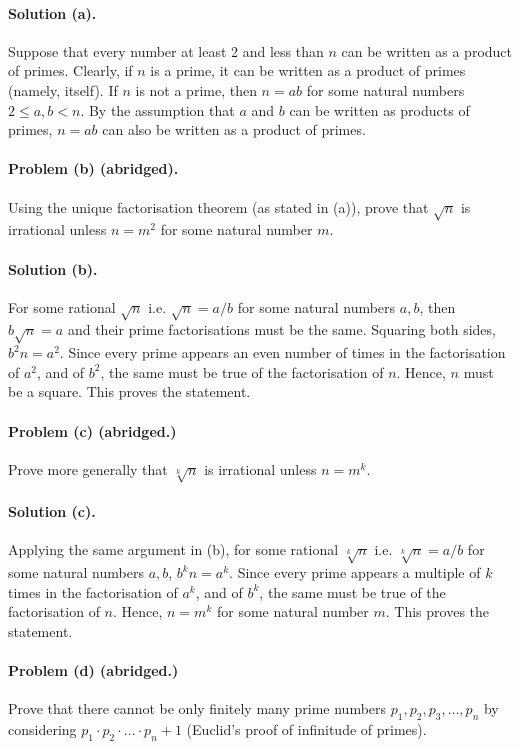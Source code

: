 \documentclass{article}
\begin{document}
\paragraph{Solution (a).} Suppose that every number at least 2 and less than $n$ can be written as a product of primes. Clearly, if $n$ is a prime, it can be written as a product of primes (namely, itself). If $n$ is not a prime, then $n = ab$ for some natural numbers $2 \leq a, b < n$. By the assumption that $a$ and $b$ can be written as products of primes, $n = ab$ can also be written as a product of primes.

\paragraph{Problem (b) (abridged).} Using the unique factorisation theorem (as stated in (a)), prove that $\sqrt{n}$ is irrational unless $n = m^2$ for some natural number $m$.

\paragraph{Solution (b).} For some rational $\sqrt{n}$ i.e. $\sqrt{n} = a/b$ for some natural numbers $a, b$, then $b\sqrt{n} = a$ and their prime factorisations must be the same. Squaring both sides, $b^2n = a^2$. Since every prime appears an even number of times in the factorisation of $a^2$, and of $b^2$, the same must be true of the factorisation of $n$. Hence, $n$ must be a square. This proves the statement.

\paragraph{Problem (c) (abridged.)} Prove more generally that $\sqrt[k]{n}$ is irrational unless $n = m^k$.

\paragraph{Solution (c).} Applying the same argument in (b), for some rational $\sqrt[k]{n}$ i.e. $\sqrt[k]{n} = a/b$ for some natural numbers $a, b$, $b^kn = a^k$. Since every prime appears a multiple of $k$ times in the factorisation of $a^k$, and of $b^k$, the same must be true of the factorisation of $n$. Hence, $n = m^k$ for some natural number $m$. This proves the statement.

\paragraph{Problem (d) (abridged.)} Prove that there cannot be only finitely many prime numbers $p_1, p_2, p_3, \ldots, p_n$ by considering $p_1 \cdot p_2 \cdot \ldots \cdot p_n + 1$ (Euclid's proof of infinitude of primes).
\end{document}
